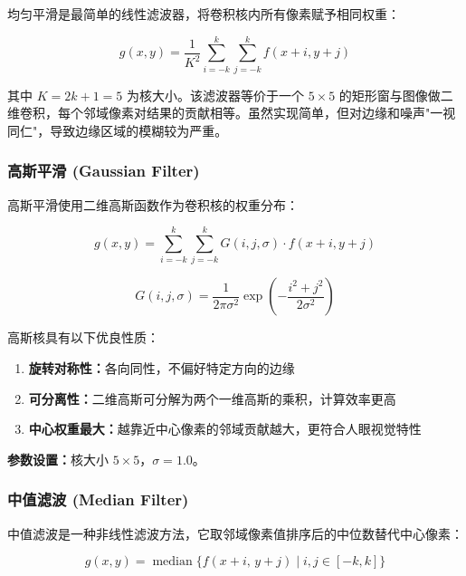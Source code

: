 \documentclass[12pt,a4paper]{ctexart}
\begin{document}
均匀平滑是最简单的线性滤波器，将卷积核内所有像素赋予相同权重：

\begin{equation}
    g(x,y) = \frac{1}{K^2} \sum_{i=-k}^{k} \sum_{j=-k}^{k} f(x+i, y+j)
    \label{eq:box}
\end{equation}

其中 $K = 2k+1 = 5$ 为核大小。该滤波器等价于一个 $5\times5$ 的矩形窗与图像做二维卷积，每个邻域像素对结果的贡献相等。虽然实现简单，但对边缘和噪声"一视同仁"，导致边缘区域的模糊较为严重。

\subsubsection{高斯平滑 (Gaussian Filter)}

高斯平滑使用二维高斯函数作为卷积核的权重分布：

\begin{equation}
    g(x,y) = \sum_{i=-k}^{k} \sum_{j=-k}^{k} G(i,j,\sigma) \cdot f(x+i, y+j)
    \label{eq:gauss_filter}
\end{equation}

\begin{equation}
    G(i,j,\sigma) = \frac{1}{2\pi\sigma^2} \exp\left(-\frac{i^2+j^2}{2\sigma^2}\right)
    \label{eq:gauss2d}
\end{equation}

高斯核具有以下优良性质：
\begin{enumerate}[leftmargin=*]
    \item \textbf{旋转对称性：}各向同性，不偏好特定方向的边缘
    \item \textbf{可分离性：}二维高斯可分解为两个一维高斯的乘积，计算效率更高
    \item \textbf{中心权重最大：}越靠近中心像素的邻域贡献越大，更符合人眼视觉特性
\end{enumerate}

\textbf{参数设置：}核大小 $5\times5$，$\sigma = 1.0$。

\subsubsection{中值滤波 (Median Filter)}

中值滤波是一种非线性滤波方法，它取邻域像素值排序后的中位数替代中心像素：

\begin{equation}
    g(x,y) = \operatorname{median}\Big\{ f(x+i,\, y+j) \;\big|\; i,j \in [-k,k] \Big\}
    \label{eq:median}
\end{equation}
\end{document}
